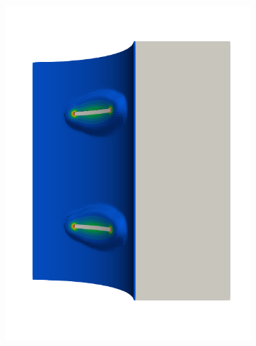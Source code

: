 \begin{frame}
\begin{columns}[T]
\begin{column}{0.6\textwidth}
\begin{figure}
{\begin{subfigure}{0.19\textwidth}
            \includegraphics[width=\textwidth]{examples/figures/seed_ep_3}
          \end{subfigure}
        }
        

\end{figure}
\end{column}
\end{columns}
\end{frame}
